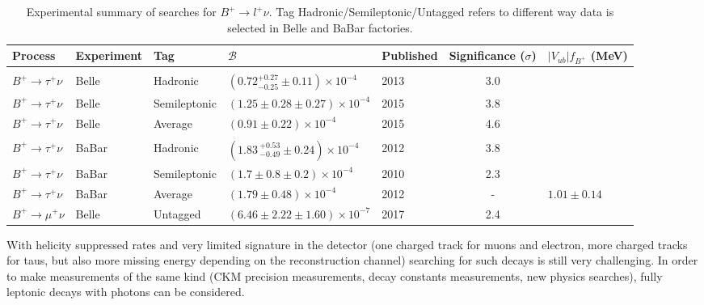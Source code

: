 \begin{table}[ht]
\begin{center}
\begin{tabular}{ l l l l H c H} \hline
	Process &Experiment & Tag &${\mathcal{B}}$ & Published & Significance ($\sigma$) & {$|V_{ub}|f_{B^+}$ (MeV)} \hfill\\
\hline\\[-2.5ex]
	$B^{+}\rightarrow \tau^{+}\nu$	&Belle~\cite{Adachi:2012mm}&Hadronic&$(0.72^{+0.27}_{-0.25}\pm0.11)\times10^{-4}$  & 2013 & 3.0 \\ 
	$B^{+}\rightarrow \tau^{+}\nu$	&Belle~\cite{Kronenbitter:2015kls}&Semileptonic&$(1.25\pm0.28\pm0.27)\times10^{-4}$ & 2015 & 3.8 \\
	$B^{+}\rightarrow \tau^{+}\nu$	&Belle~\cite{Kronenbitter:2015kls}&Average&$(0.91 \pm 0.22)\times10^{-4}$ & 2015 & 4.6 \\\hline\\[-2.5ex]
	$B^{+}\rightarrow \tau^{+}\nu$	&BaBar~\cite{Lees:2012ju} & Hadronic & $(1.83\,^{+0.53}_{-0.49}\pm0.24)\times10^{-4}$ & 2012 & 3.8 \\ 
	$B^{+}\rightarrow \tau^{+}\nu$	&BaBar~\cite{Aubert:2009wt} & Semileptonic & $(1.7\pm 0.8\pm 0.2)\times10^{-4}$ & 2010 & 2.3\\ 
	$B^{+}\rightarrow \tau^{+}\nu$	&BaBar~\cite{Lees:2012ju} & Average & $(1.79 \pm 0.48)\times 10^{-4}$ & 2012 & - & $1.01\pm 0.14$  \\ \hline
$B^{+}\rightarrow \mu^{+}\nu$ & Belle~\cite{Sibidanov:2017vph} & Untagged& $(6.46\pm2.22\pm 1.60)\times 10^{-7}$ & 2017 & 2.4 &\\
\hline
\end{tabular}
\end{center}
\caption{Experimental summary of searches for $B^{+}\rightarrow l^{+}\nu$. Tag Hadronic/Semileptonic/Untagged refers to different way data is selected in Belle and BaBar factories.}
\label{tab:sum}
\end{table}


With helicity suppressed rates and very limited signature in the detector (one charged track for muons and electron, more charged tracks for taus, but also more missing energy depending on the reconstruction channel) searching for such decays is still very challenging. In order to make measurements of the same kind (CKM precision measurements, decay constants measurements, new physics searches), fully leptonic decays with photons can be considered.   

